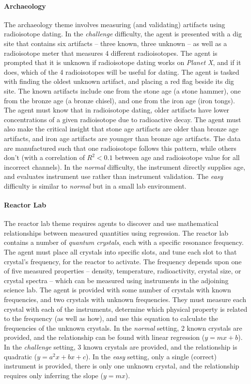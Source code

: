 \documentclass{article}
\begin{document}
\paragraph{Archaeology} The archaeology theme involves measuring (and validating) artifacts using radioisotope dating.  In the \textit{challenge} difficulty, the agent is presented with a dig site that contains six artifacts -- three known, three unknown -- as well as a radioisotope meter that measures 4 different radioisotopes.  The agent is prompted that it is unknown if radioisotope dating works on \textit{Planet X}, and if it does, which of the 4 radioisotopes will be useful for dating.  The agent is tasked with finding the oldest unknown artifact, and placing a red flag beside its dig site.  The known artifacts include one from the stone age (a stone hammer), one from the bronze age (a bronze chisel), and one from the iron age (iron tongs).  The agent must know that in radioisotope dating, older artifacts have lower concentrations of a given radioisotope due to radioactive decay.  The agent must also make the critical insight that stone age artifacts are older than bronze age artifacts, and iron age artifacts are younger than bronze age artifacts.  The data are manufactured such that one radioisotope follows this pattern, while others don't (with a correlation of $R^{2} < 0.1$ between age and radioisotope value for all incorrect channels).  In the \textit{normal} difficulty, the instrument directly supplies age, and evaluates instrument use rather than instrument validation.  The \textit{easy} difficulty is similar to \textit{normal} but in a small lab environment.

\paragraph{Reactor Lab} The reactor lab theme requires agents to discover and use mathematical relationships between measured quantities using regression.  The reactor lab contains a number of \textit{quantum crystals}, each with a specific resonance frequency.  The agent must place all crystals into specific slots, and tune each slot to that crystal's frequency, for the reactor to activate.  The frequency depends upon one of five measured properties -- density, temperature, radioactivity, crystal size, or crystal spectra -- which can be measured using instruments in the adjoining science lab.  The agent is provided with some number of crystals with known frequencies, and two crystals with unknown frequencies.  They must measure each crystal with each of the instruments, determine which physical property is related to the frequency (as well as how), and use this equation to calculate the frequencies of the unknown crystals.  In the \textit{normal} setting, 2 known crystals are provided, and the relationship can be found with linear regression ($y=mx+b$).  In the \textit{challenge} setting, 3 known crystals are provided, and the relationship is quadratic ($y=a^2x+bx+c$).  In the \textit{easy} setting, only a single (correct) instrument is provided, there is only one unknown crystal, and the relationship requires only inferring the slope ($y=mx$).
\end{document}
